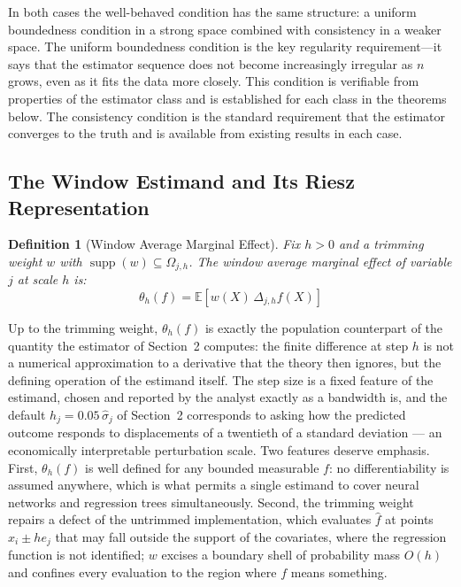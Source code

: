 \documentclass[12pt]{article}
\newtheorem{definition}{Definition}
\newcommand{\E}{\mathbb{E}}
\newcommand{\Dh}{\Delta_{j,h}}
\begin{document}
	In both cases the well-behaved condition has the same structure: a uniform
	boundedness condition in a strong space combined with consistency in a weaker space.
	The uniform boundedness condition is the key regularity requirement---it says that
	the estimator sequence does not become increasingly irregular as $n$ grows, even as
	it fits the data more closely. This condition is verifiable from properties of the
	estimator class and is established for each class in the theorems below. The
	consistency condition is the standard requirement that the estimator converges to the
	truth and is available from existing results in each case.
	
	\subsection{The Window Estimand and Its Riesz Representation}
	\label{sec:window}
	
	\begin{definition}[Window Average Marginal Effect]
		\label{def:window}
		Fix $h > 0$ and a trimming weight $w$ with
		$\operatorname{supp}(w) \subseteq \Omega_{j,h}$. The \emph{window average
		marginal effect} of variable $j$ at scale $h$ is:
		\begin{equation}
			\theta_h(f) = \E\left[w(X)\, \Dh f(X)\right]
		\end{equation}
	\end{definition}
	
	Up to the trimming weight, $\theta_h(f)$ is exactly the population counterpart of
	the quantity the estimator of Section~2 computes: the finite difference at step $h$
	is not a numerical approximation to a derivative that the theory then ignores, but
	the defining operation of the estimand itself. The step size is a fixed feature of
	the estimand, chosen and reported by the analyst exactly as a bandwidth is, and the
	default $h_j = 0.05\,\hat{\sigma}_j$ of Section~2 corresponds to asking how the
	predicted outcome responds to displacements of a twentieth of a standard deviation
	--- an economically interpretable perturbation scale. Two features deserve emphasis.
	First, $\theta_h(f)$ is well defined for any bounded measurable $f$: no
	differentiability is assumed anywhere, which is what permits a single estimand to
	cover neural networks and regression trees simultaneously. Second, the trimming
	weight repairs a defect of the untrimmed implementation, which evaluates
	$\hat{f}$ at points $x_i \pm h e_j$ that may fall outside the support of the
	covariates, where the regression function is not identified; $w$ excises a boundary
	shell of probability mass $O(h)$ and confines every evaluation to the region where
	$f$ means something.
\end{document}
